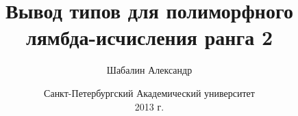 \documentclass{beamer}
\title{Вывод типов для полиморфного лямбда-исчисления ранга 2}
\author{Шабалин Александр}
\date{\scriptsize Санкт-Петербургский Академический университет\\ \vspace{.10cm}2013 г.}
\begin{document}
\frame{\titlepage}


\end{document}
